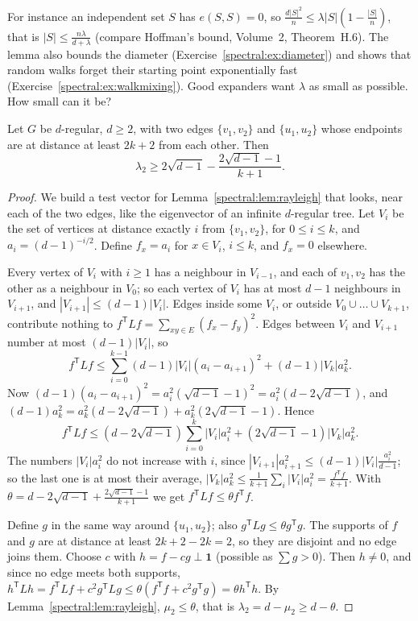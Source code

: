 For instance an independent set $S$ has $e(S,S)=0$, so $\frac{d|S|^2}n\le\lambda|S|(1-\frac{|S|}n)$, that is $|S|\le\frac{n\lambda}{d+\lambda}$ (compare Hoffman's bound, Volume~2, Theorem~H.6). The lemma also
bounds the diameter (Exercise~\ref{spectral:ex:diameter}) and shows that random walks forget their starting point exponentially fast (Exercise~\ref{spectral:ex:walkmixing}). Good expanders want $\lambda$ as small as
possible. How small can it be?

\begin{theorem}\label{spectral:thm:alonboppana}
Let $G$ be $d$-regular, $d\ge2$, with two edges $\{v_1,v_2\}$ and $\{u_1,u_2\}$ whose endpoints are at distance at least $2k+2$ from each other. Then
\[
\lambda_2\ge2\sqrt{d-1}-\frac{2\sqrt{d-1}-1}{k+1}.
\]
\end{theorem}
\begin{proof}
We build a test vector for Lemma~\ref{spectral:lem:rayleigh} that looks, near each of the two edges, like the eigenvector of an infinite $d$-regular tree. Let $V_i$ be the set of vertices at distance
exactly $i$ from $\{v_1,v_2\}$, for $0\le i\le k$, and $a_i=(d-1)^{-i/2}$. Define $f_x=a_i$ for $x\in V_i$, $i\le k$, and $f_x=0$ elsewhere.

Every vertex of $V_i$ with $i\ge1$ has a neighbour in $V_{i-1}$, and each of $v_1,v_2$ has the other as a neighbour in $V_0$; so each vertex of $V_i$ has at most $d-1$ neighbours in $V_{i+1}$, and
$|V_{i+1}|\le(d-1)|V_i|$. Edges inside some $V_i$, or outside $V_0\cup\dots\cup V_{k+1}$, contribute nothing to $f^{\mathsf T}Lf=\sum_{xy\in E}(f_x-f_y)^2$. Edges between $V_i$ and $V_{i+1}$ number at most
$(d-1)|V_i|$, so
\[
f^{\mathsf T}Lf\le\sum_{i=0}^{k-1}(d-1)|V_i|(a_i-a_{i+1})^2+(d-1)|V_k|a_k^2.
\]
Now $(d-1)(a_i-a_{i+1})^2=a_i^2(\sqrt{d-1}-1)^2=a_i^2(d-2\sqrt{d-1})$, and $(d-1)a_k^2=a_k^2(d-2\sqrt{d-1})+a_k^2(2\sqrt{d-1}-1)$. Hence
\[
f^{\mathsf T}Lf\le(d-2\sqrt{d-1})\sum_{i=0}^k|V_i|a_i^2+(2\sqrt{d-1}-1)|V_k|a_k^2.
\]
The numbers $|V_i|a_i^2$ do not increase with $i$, since $|V_{i+1}|a_{i+1}^2\le(d-1)|V_i|\frac{a_i^2}{d-1}$; so the last one is at most their average, $|V_k|a_k^2\le\frac1{k+1}\sum_i|V_i|a_i^2=\frac{f^{\mathsf T}f}{k+1}$. With
$\theta=d-2\sqrt{d-1}+\frac{2\sqrt{d-1}-1}{k+1}$ we get $f^{\mathsf T}Lf\le\theta f^{\mathsf T}f$.

Define $g$ in the same way around $\{u_1,u_2\}$; also $g^{\mathsf T}Lg\le\theta g^{\mathsf T}g$. The supports of $f$ and $g$ are at distance at least $2k+2-2k=2$, so they are disjoint and no edge joins them.
Choose $c$ with $h=f-cg\perp\mathbf1$ (possible as $\sum g>0$). Then $h\ne0$, and since no edge meets both supports, $h^{\mathsf T}Lh=f^{\mathsf T}Lf+c^2g^{\mathsf T}Lg\le\theta(f^{\mathsf T}f+c^2g^{\mathsf T}g)=\theta h^{\mathsf T}h$. By
Lemma~\ref{spectral:lem:rayleigh}, $\mu_2\le\theta$, that is $\lambda_2=d-\mu_2\ge d-\theta$.
\end{proof}

